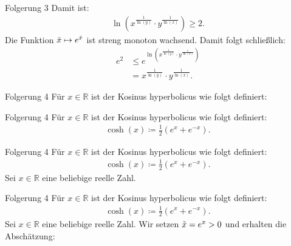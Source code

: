 \documentclass[10pt]{beamer}
\def\bR{\mathbb{R}}
\begin{document}
\begin{frame}{Folgerung 3}
    Damit ist:
    \begin{align*}
        \ln\left( x^{\frac{1}{\ln\left( y \right)}} \cdot y^{\frac{1}{\ln\left( x \right)}} \right) 
        \geq 2.
    \end{align*}
    Die Funktion \( \Tilde{x} \mapsto e^{\Tilde{x}} \) ist streng monoton wachsend. Damit folgt schließlich:
    \begin{align*}
        e^{2}
        & \leq e^{\ln\left( x^{\frac{1}{\ln\left( y \right)}} \cdot y^{\frac{1}{\ln\left( x \right)}} \right)} \\
        & = x^{\frac{1}{\ln\left( y \right)}} \cdot y^{\frac{1}{\ln\left( x \right)}}.
    \end{align*}
\end{frame}



\begin{frame}{Folgerung 4}
    Für \( x \in \bR \) ist der Kosinus hyperbolicus wie folgt definiert:
\end{frame}



\begin{frame}{Folgerung 4}
    Für \( x \in \bR \) ist der Kosinus hyperbolicus wie folgt definiert:
    \begin{align*}
        \cosh\left( x \right)
        \coloneq \frac{1}{2} \left( e^{x} + e^{-x} \right).
    \end{align*}
\end{frame}



\begin{frame}{Folgerung 4}
    Für \( x \in \bR \) ist der Kosinus hyperbolicus wie folgt definiert:
    \begin{align*}
        \cosh\left( x \right)
        \coloneq \frac{1}{2} \left( e^{x} + e^{-x} \right).
    \end{align*}
    Sei \( x \in \bR \) eine beliebige reelle Zahl.
\end{frame}



\begin{frame}{Folgerung 4}
    Für \( x \in \bR \) ist der Kosinus hyperbolicus wie folgt definiert:
    \begin{align*}
        \cosh\left( x \right)
        \coloneq \frac{1}{2} \left( e^{x} + e^{-x} \right).
    \end{align*}
    Sei \( x \in \bR \) eine beliebige reelle Zahl. Wir setzen \( \Tilde{x} = e^{x} > 0 \) und erhalten die Abschätzung:
\end{frame}
\end{document}
